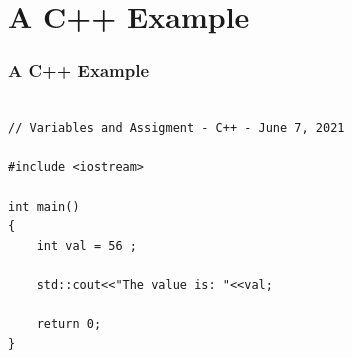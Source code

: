 \documentclass[fleqn]{beamer} %
\newcommand{\sectiontitleV}{A C++ Example }
\begin{document}
\section{\sectiontitleV}	
	\begin{frame}[label=sectionV,containsverbatim] \small
		\frametitle{\sectiontitleV}    
		
		\begin{lstlisting}

// Variables and Assigment - C++ - June 7, 2021

#include <iostream>

int main()
{
	int val = 56 ;
	
	std::cout<<"The value is: "<<val;
	
	return 0;
}
		
		\end{lstlisting}

	\end{frame}
\end{document}
